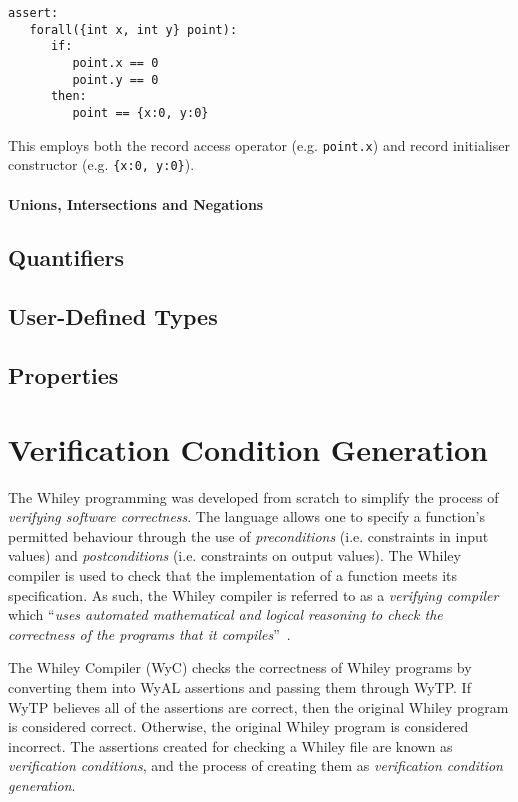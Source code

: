 \begin{lstlisting}[language=WyAL]
assert:
   forall({int x, int y} point):
      if:
         point.x == 0
         point.y == 0
      then:
         point == {x:0, y:0}
\end{lstlisting}

This employs both the record access operator
(e.g. \lstinline{point.x}) and record initialiser constructor
(e.g. \lstinline|{x:0, y:0}|).

\paragraph{Unions, Intersections and Negations}


\subsection{Quantifiers}

\subsection{User-Defined Types}
\subsection{Properties}

\section{Verification Condition Generation}

The Whiley programming was developed from scratch to simplify the
process of {\em verifying software correctness}.  The language allows
one to specify a function's permitted behaviour through the use of
{\em preconditions} (i.e. constraints in input values) and {\em
  postconditions} (i.e. constraints on output values).  The Whiley
compiler is used to check that the implementation of a function meets
its specification.  As such, the Whiley compiler is referred to as a
{\em verifying compiler} which ``{\em uses automated mathematical and
  logical reasoning to check the correctness of the programs that it
  compiles}''~\cite{Hoare03}.

The Whiley Compiler (WyC) checks the correctness of Whiley programs by
converting them into WyAL assertions and passing them through WyTP.
If WyTP believes all of the assertions are correct, then the original
Whiley program is considered correct.  Otherwise, the original Whiley
program is considered incorrect.  The assertions created for checking
a Whiley file are known as {\em verification conditions}, and the
process of creating them as {\em verification condition generation}.


